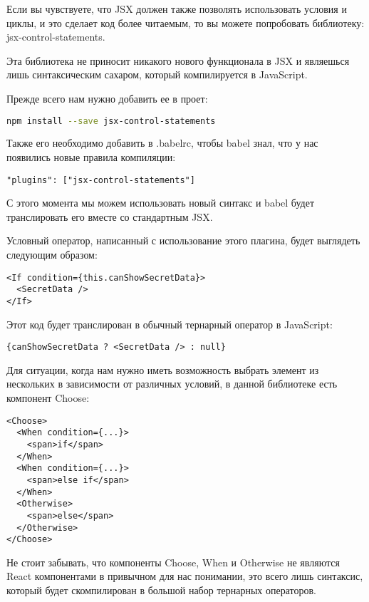 \documentclass[12pt]{book}
\begin{document}
Если вы чувствуете, что JSX должен также позволять использовать условия и циклы, и это сделает код более читаемым, то вы можете попробовать библиотеку: jsx-control-statements.

Эта библиотека не приносит никакого нового функционала в JSX и являешься лишь синтаксическим сахаром, который компилируется в JavaScript.

Прежде всего нам нужно добавить ее в проет:

\begin{lstlisting}[language=bash]
npm install --save jsx-control-statements
\end{lstlisting}

Также его необходимо добавить в .babelrc, чтобы babel знал, что у нас появились новые правила компиляции:

\begin{lstlisting}
"plugins": ["jsx-control-statements"]
\end{lstlisting}

С этого момента мы можем использовать новый синтакс и babel будет транслировать его вместе со стандартным JSX.

Условный оператор, написанный с использование этого плагина, будет выглядеть следующим образом:

\begin{lstlisting}
<If condition={this.canShowSecretData}>
  <SecretData />
</If>
\end{lstlisting}

Этот код будет транслирован в обычный тернарный оператор в JavaScript:

\begin{lstlisting}
{canShowSecretData ? <SecretData /> : null}
\end{lstlisting}

Для ситуации, когда нам нужно иметь возможность выбрать элемент из нескольких в зависимости от различных условий, в данной библиотеке есть компонент Choose:

\begin{lstlisting}
<Choose>
  <When condition={...}>
    <span>if</span>
  </When>
  <When condition={...}>
    <span>else if</span>
  </When>
  <Otherwise>
    <span>else</span>
  </Otherwise>
</Choose>
\end{lstlisting}

Не стоит забывать, что компоненты Choose, When и Otherwise не являются React компонентами в привычном для нас понимании, это всего лишь синтаксис, который будет скомпилирован в большой набор тернарных операторов.
\end{document}
